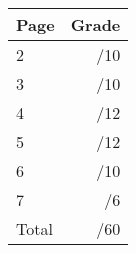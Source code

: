 \documentclass[12pt]{article}
\newcommand{\skipline}{\vspace{12pt}}
\begin{document}
\begin{table}[hbt]
\begin{center}
\begin{tabular}{|l|r|} \hline
Page&Grade\\
\hline \hline
\cline{1-2} 2 & \enspace\enspace\enspace\enspace\enspace\enspace/10\\
\cline{1-2} 3 & \enspace\enspace\enspace\enspace\enspace\enspace/10\\
\cline{1-2} 4 & \enspace\enspace\enspace\enspace\enspace\enspace/12\\
\cline{1-2} 5 & \enspace\enspace\enspace\enspace\enspace\enspace/12\\
\cline{1-2} 6 & \enspace\enspace\enspace\enspace\enspace\enspace/10\\
\cline{1-2} 7 & \enspace\enspace\enspace\enspace\enspace\enspace/6\\
\cline{1-2} Total & \enspace\enspace\enspace\enspace\enspace\enspace/60\\
\hline
\end{tabular}

\skipline

\skipline

\skipline


\end{center}
\end{table}
\newpage
\end{document}
